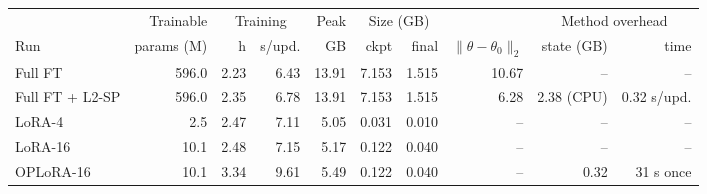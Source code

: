 \setlength{\tabcolsep}{4pt}
\begin{tabular}{@{}l r rr r rr r rr@{}}
\toprule
 & Trainable & \multicolumn{2}{c}{Training} & Peak & \multicolumn{2}{c}{Size (GB)} & & \multicolumn{2}{c}{Method overhead} \\ \cmidrule(lr){3-4} \cmidrule(lr){6-7} \cmidrule(lr){9-10}
Run & params (M) & h & s/upd. & GB & ckpt & final & $\|\theta-\theta_0\|_2$ & state (GB) & time \\
\midrule
Full FT & 596.0 & 2.23 & 6.43 & 13.91 & 7.153 & 1.515 & 10.67 & -- & -- \\
Full FT + L2-SP & 596.0 & 2.35 & 6.78 & 13.91 & 7.153 & 1.515 & 6.28 & 2.38 (CPU) & 0.32 s/upd. \\
LoRA-4 & 2.5 & 2.47 & 7.11 & 5.05 & 0.031 & 0.010 & -- & -- & -- \\
LoRA-16 & 10.1 & 2.48 & 7.15 & 5.17 & 0.122 & 0.040 & -- & -- & -- \\
OPLoRA-16 & 10.1 & 3.34 & 9.61 & 5.49 & 0.122 & 0.040 & -- & 0.32 & 31 s once \\
\bottomrule
\end{tabular}
